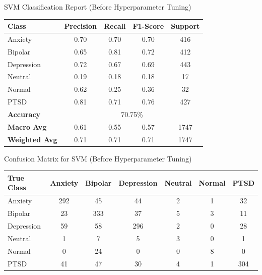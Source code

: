 \begin{center}
    SVM Classification Report (Before Hyperparameter Tuning)
\begin{tabular}{|l|c|c|c|c|}
\hline
\textbf{Class} & \textbf{Precision} & \textbf{Recall} & \textbf{F1-Score} & \textbf{Support} \\ \hline
Anxiety        & 0.70               & 0.70            & 0.70              & 416              \\ \hline
Bipolar        & 0.65               & 0.81            & 0.72              & 412              \\ \hline
Depression     & 0.72               & 0.67            & 0.69              & 443              \\ \hline
Neutral        & 0.19               & 0.18            & 0.18              & 17               \\ \hline
Normal         & 0.62               & 0.25            & 0.36              & 32               \\ \hline
PTSD           & 0.81               & 0.71            & 0.76              & 427              \\ \hline
\textbf{Accuracy} & \multicolumn{4}{|c|}{70.75\%} \\ \hline
\textbf{Macro Avg} & 0.61            & 0.55            & 0.57              & 1747             \\ \hline
\textbf{Weighted Avg} & 0.71         & 0.71            & 0.71              & 1747             \\ \hline
\end{tabular}

\vspace{0.25in}

Confusion Matrix for SVM (Before Hyperparameter Tuning)
\begin{tabular}{|l|c|c|c|c|c|c|}
\hline
\textbf{True Class} & \textbf{Anxiety} & \textbf{Bipolar} & \textbf{Depression} & \textbf{Neutral} & \textbf{Normal} & \textbf{PTSD} \\ \hline
Anxiety             & 292              & 45               & 44                  & 2                & 1               & 32            \\ \hline
Bipolar             & 23               & 333              & 37                  & 5                & 3               & 11            \\ \hline
Depression          & 59               & 58               & 296                 & 2                & 0               & 28            \\ \hline
Neutral             & 1                & 7                & 5                   & 3                & 0               & 1             \\ \hline
Normal              & 0                & 24               & 0                   & 0                & 8               & 0             \\ \hline
PTSD                & 41               & 47               & 30                  & 4                & 1               & 304           \\ \hline
\end{tabular}


\end{center}
